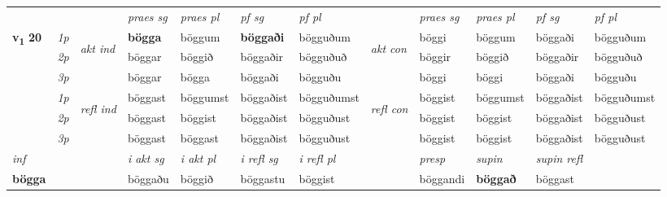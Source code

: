 \begin{longtable}[l]{X>{\footnotesize\itshape}llXXXXlXXXX}
 & &   & \textit{praes sg}  & \textit{praes pl}    & \textit{ pf sg} & \textit{pf pl} & & \textit{praes sg}  & \textit{praes pl}    & \textit{pf sg} & \textit{pf pl }  \\ \cmidrule{4-7} \cmidrule{9-12}
 \multirow{2}{*}{{{\textbf{v{\textsubscript{1}}} \Large{\textbf{20}}}}}  & 1p & \multirow{3}{*}{\begin{turn}{90}\textit{akt ind}\end{turn}} & \textbf{bögga} & böggum & \textbf{böggaði} & bögguðum & \multirow{3}{*}{\begin{turn}{90}\textit{akt con}\end{turn}} &böggi & böggum & böggaði & bögguðum\\*
 & 2p &  &  böggar  & böggið & böggaðir & bögguðuð & & böggir & böggið & böggaðir & bögguðuð \\*
 & 3p &  & böggar & bögga & böggaði & bögguðu & & böggi & böggi& böggaði & bögguðu \\*
\cmidrule{4-7} \cmidrule{9-12}
 & 1p & \multirow{3}{*}{\begin{turn}{90}\textit{refl ind}\end{turn}}  & böggast & böggumst & böggaðist & bögguðumst & \multirow{3}{*}{\begin{turn}{90}\textit{refl con}\end{turn}}  &böggist & böggumst & böggaðist & bögguðumst \\*
 & 2p &  & böggast & böggist & böggaðist & bögguðust & &böggist & böggist & böggaðist & bögguðust \\*
 & 3p  & & böggast & böggast & böggaðist & bögguðust & & böggist & böggist& böggaðist & bögguðust \\*
\cmidrule{4-7} \cmidrule{9-12}

   {\textit{inf}} & &  & \textit{i akt sg} & \textit{i akt pl} & \textit{i refl sg} & \textit{i refl pl} && \textit{presp} & \textit{supin} & \textit{supin refl}  \\*
  {\textbf{bögga}} & && böggaðu  & böggið & böggastu & böggist && böggandi &  \textbf{böggað} & böggast  \\*

\midrule


\end{longtable}
